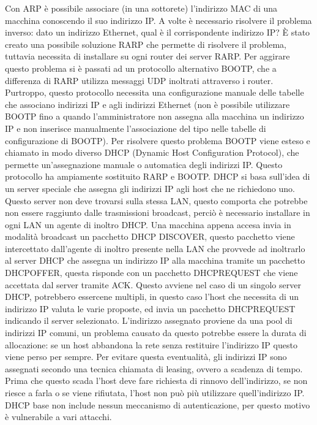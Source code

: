 Con ARP è possibile associare (in una sottorete) l’indirizzo MAC di una macchina conoscendo il suo indirizzo IP.
A volte è necessario risolvere il problema inverso: dato un indirizzo Ethernet, qual è il corrispondente indirizzo IP?
È stato creato una possibile soluzione RARP che permette di risolvere il problema, tuttavia necessita di installare su ogni router dei server RARP. Per aggirare questo problema si è passati ad un protocollo alternativo BOOTP, che a differenza di RARP utilizza messaggi UDP inoltrati attraverso i router. Purtroppo, questo protocollo necessita una configurazione manuale delle tabelle che associano indirizzi IP e agli indirizzi Ethernet (non è possibile utilizzare BOOTP fino a quando l’amministratore non assegna alla macchina un indirizzo IP e non inserisce manualmente l’associazione del tipo nelle tabelle di configurazione di BOOTP).
Per risolvere questo problema BOOTP viene esteso e chiamato in modo diverso DHCP (Dynamic Host Configuration Protocol), che permette un’assegnazione manuale o automatica degli indirizzi IP.
Questo protocollo ha ampiamente sostituito RARP e BOOTP.
DHCP si basa sull’idea di un server speciale che assegna gli indirizzi IP agli host che ne richiedono uno.
Questo server non deve trovarsi sulla stessa LAN, questo comporta che potrebbe non essere raggiunto dalle trasmissioni broadcast, perciò è necessario installare in ogni LAN un agente di inoltro DHCP.
Una macchina appena accesa invia in modalità broadcast un pacchetto DHCP DISCOVER, questo pacchetto viene intercettato dall’agente di inoltro presente nella LAN che provvede ad inoltrarlo al server DHCP che assegna un indirizzo IP alla macchina tramite un pacchetto DHCPOFFER, questa risponde con un pacchetto DHCPREQUEST che viene accettata dal server tramite ACK.
Questo avviene nel caso di un singolo server DHCP, potrebbero essercene multipli, in questo caso l’host che necessita di un indirizzo IP valuta le varie proposte, ed invia un pacchetto DHCPREQUEST indicando il server selezionato.
L’indirizzo assegnato proviene da una pool di indirizzi IP comuni, un problema causato da questo potrebbe essere la durata di allocazione: se un host abbandona la rete senza restituire l’indirizzo IP questo viene perso per sempre.
Per evitare questa eventualità, gli indirizzi IP sono assegnati secondo una tecnica chiamata di leasing, ovvero a scadenza di tempo. Prima che questo scada l’host deve fare richiesta di rinnovo dell’indirizzo, se non riesce a farla o se viene rifiutata, l’host non può più utilizzare quell’indirizzo IP.
DHCP base non include nessun meccanismo di autenticazione, per questo motivo è vulnerabile a vari attacchi.

